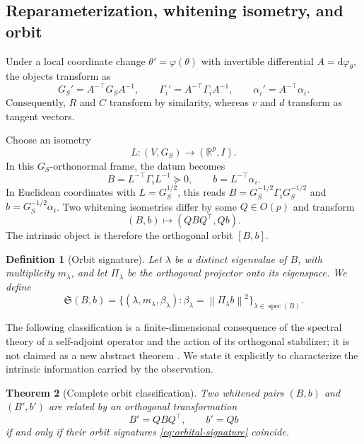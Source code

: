 \documentclass[10pt,a4paper]{article}
\newtheorem{theorem}{Theorem}[section]
\newtheorem{definition}[theorem]{Definition}
\newcommand{\R}{\mathbb{R}}
\newcommand{\spec}{\operatorname{spec}}
\newcommand{\norm}[1]{\left\lVert #1\right\rVert}
\newcommand{\dd}{\mathrm d}
\newcommand{\Sigreg}{\mathfrak S}
\begin{document}
\subsection{Reparameterization, whitening isometry, and orbit}
Under a local coordinate change $\theta'=\varphi(\theta)$ with invertible differential $A=\dd\varphi_\theta$, the objects transform as
\begin{equation}
G_S'=A^{-\top}G_SA^{-1},
\qquad
\Gamma_i'=A^{-\top}\Gamma_iA^{-1},
\qquad
\alpha_i'=A^{-\top}\alpha_i.
\label{eq:covariance-laws}
\end{equation}
Consequently, $R$ and $C$ transform by similarity, whereas $v$ and $d$ transform as tangent vectors.

Choose an isometry
\[
L:(V,G_S)\longrightarrow(\R^p,I).
\]
In this $G_S$-orthonormal frame, the datum becomes
\begin{equation}
B=L^{-\top}\Gamma_iL^{-1}\succeq0,
\qquad
b=L^{-\top}\alpha_i.
\label{eq:whitened-pair}
\end{equation}
In Euclidean coordinates with $L=G_S^{1/2}$, this reads $B=G_S^{-1/2}\Gamma_iG_S^{-1/2}$ and $b=G_S^{-1/2}\alpha_i$. Two whitening isometries differ by some $Q\in O(p)$ and transform
\begin{equation}
(B,b)\longmapsto(QBQ^\top,Qb).
\end{equation}
The intrinsic object is therefore the orthogonal orbit $[B,b]$.

\begin{definition}[Orbit signature]
Let $\lambda$ be a distinct eigenvalue of $B$, with multiplicity $m_\lambda$, and let $\Pi_\lambda$ be the orthogonal projector onto its eigenspace. We define
\begin{equation}
\boxed{
\Sigreg(B,b)
=
\bigl\{(\lambda,m_\lambda,\beta_\lambda):
\beta_\lambda=\norm{\Pi_\lambda b}^2\bigr\}_{\lambda\in\spec(B)}.
}
\label{eq:orbital-signature}
\end{equation}
\end{definition}

The following classification is a finite-dimensional consequence of the spectral theory of a self-adjoint operator and the action of its orthogonal stabilizer; it is not claimed as a new abstract theorem \citep{halmos1951,weyl1946,sibirskii1967,sibirskii1968,khadzhiev1967}. We state it explicitly to characterize the intrinsic information carried by the observation.

\begin{theorem}[Complete orbit classification]
Two whitened pairs $(B,b)$ and $(B',b')$ are related by an orthogonal transformation
\[
B'=QBQ^\top,
\qquad
b'=Qb
\]
if and only if their orbit signatures \eqref{eq:orbital-signature} coincide.
\label{thm:orbit-classification}
\end{theorem}
\end{document}
